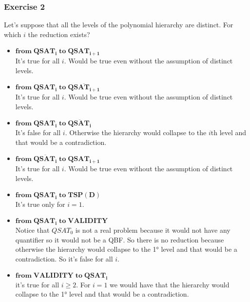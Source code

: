 \subsubsection{Exercise 2}
Let's suppose that all the levels of the polynomial hierarchy are distinct. For which $i$ the reduction exists?
\begin{itemize}
    \item $\mathbf{from \; QSAT_i \; to \; QSAT_{i+1}}$\\
    It's true for all $i$. Would be true even without the assumption of distinct levels.
    \item $\mathbf{from \; QSAT_i \; to \; \overline{QSAT_{i+1}}}$\\
    It's true for all $i$. Would be true even without the assumption of distinct levels.
    \item $\mathbf{from \; QSAT_i \; to \; \overline{QSAT_i}}$\\
    It's false for all $i$. Otherwise the hierarchy would collapse to the $i$th level and that would be a contradiction.
    \item $\mathbf{from \; \overline{QSAT_i} \; to \; QSAT_{i+1}}$\\
    It's true for all $i$. Would be true even without the assumption of distinct levels.
    \item $\mathbf{from \; QSAT_i \; to \; TSP(D)}$\\
    It's true only for $i=1$.
    \item $\mathbf{from \; QSAT_i \; to \; VALIDITY}$\\
    Notice that $QSAT_0$ is not a real problem because it would not have any quantifier so it would not be a QBF. So there is no reduction because otherwise the hierarchy would collapse to the 1° level and that would be a contradiction. So it's false for all $i$.
    \item $\mathbf{from \; VALIDITY \; to \;QSAT_i }$\\
    it's true for all $i\ge 2$. For $i=1$ we would have that the hierarchy would collapse to the 1° level and that would be a contradiction.
\end{itemize}
